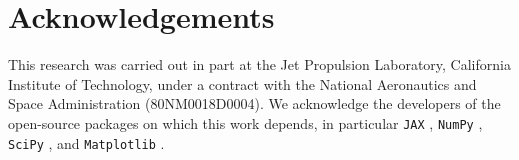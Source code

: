 \documentclass[10pt,a4paper,onecolumn]{article}
\begin{document}
\section{Acknowledgements}
This research was carried out in part at the Jet Propulsion Laboratory, California Institute of Technology, under a contract with the National Aeronautics and Space Administration (80NM0018D0004). We acknowledge the developers of the open-source packages on which this work depends, in particular \texttt{JAX} \citep{jax:2018}, \texttt{NumPy} \citep{Harris:2020}, \texttt{SciPy} \citep{Virtanen:2020}, and \texttt{Matplotlib} \citep{Hunter:2007}.


\end{document}
